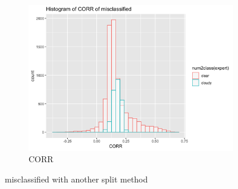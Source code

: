 \documentclass[jou]{apa}%
\begin{document}
\begin{figure}[H]
\begin{subfigure}{0.4\columnwidth}
    \includegraphics[scale=.1]{CORRsplit}
    \caption{CORR}
    \label{fig:2}
  \end{subfigure}
 \caption{misclassified with another split method}
\end{figure}
\end{document}
